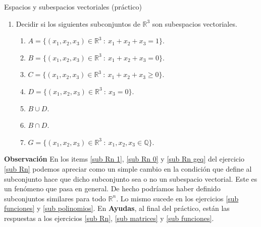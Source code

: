 \begin{chapter}{Espacios y subespacios vectoriales (práctico)}
\begin{enumerate}[topsep=6pt, itemsep=.4cm]
\item\label{sub Rn} Decidir si los siguientes subconjuntos de $\mathbb{R}^3$ son subespacios vectoriales.


    \begin{enumerate}
        \item\label{sub Rn 1} $A=\{(x_1, x_2 ,x_3) \in \mathbb{R}^3 \ : \ x_1 + x_2 + x_3=1\}$.
        \item\label{sub Rn 0} $B=\{(x_1, x_2 ,x_3) \in \mathbb{R}^3 \ : \ x_1 + x_2 + x_3=0\}$.
        \item\label{sub Rn geq} $C=\{(x_1, x_2 ,x_3) \in \mathbb{R}^3 \ : \ x_1 + x_2 + x_3 \geq 0\}$.
        \item\label{sub Rn 1 30} $D=\{(x_1, x_2 ,x_3) \in \mathbb{R}^3 \ : \ x_3=0\}$.
        \item\label{sub Rn cup} $B\cup D$.
        \item\label{sub Rn cap} $B\cap D$.
        \item\label{sub Rn q} $G=\{(x_1, x_2 ,x_3) \in \mathbb{R}^3 \ :\ x_1, x_2, x_3\in\mathbb{Q}\}$.
    \end{enumerate}
\end{enumerate}

\textbf{Observación} En los items \ref{sub Rn 1}, \ref{sub Rn 0} y \ref{sub Rn geq} del ejercicio \ref{sub Rn} podemos apreciar como un simple cambio en la condición que define al subconjunto hace que dicho subconjunto sea o no un subespacio vectorial. Este es un fenómeno que pasa en general. De hecho podríamos haber definido subconjuntos similares para todo $\mathbb{R}^n$. Lo mismo sucede en los ejercicios \ref{sub funciones} y \ref{sub polinomios}.
En \textbf{Ayudas},  al final del práctico, están las respuestas a los ejercicios \ref{sub Rn}, \ref{sub matrices} y \ref{sub funciones}. 
        
\begin{enumerate}[resume, topsep=6pt, itemsep=.4cm]


\end{enumerate}
\end{chapter}
